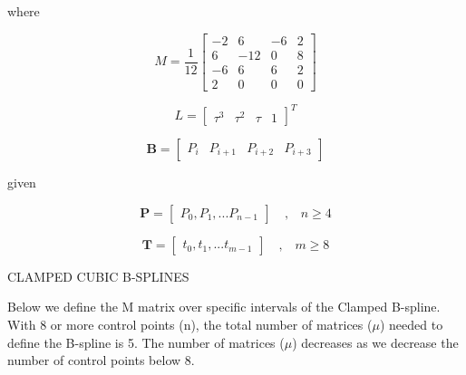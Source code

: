\documentclass{article}
\begin{document}
    where 
    
    \begin{equation}
    M = \frac{1}{12} \begin{bmatrix} -2 & 6 & -6 & 2 \\
                                          6 & -12 & 0 & 8 \\
                                         -6 & 6 & 6 & 2 \\
                                          2 & 0 & 0 & 0 \end{bmatrix}
    \end{equation}
    
    \begin{equation}
        L = \begin{bmatrix} \tau^{3} & \tau^{2} & \tau & 1 \end{bmatrix}^{T}
    \end{equation}
    
    \begin{equation}
        \textbf{B} = \begin{bmatrix} P_{i} & P_{i+1} & P_{i+2} & P_{i+3}\end{bmatrix}
    \end{equation}
    
    given
    
    \begin{equation}
    \textbf{P} = \begin{bmatrix} P_0, P_1, ... P_{n-1} \end{bmatrix} \quad \text{,} \quad n \geq 4
    \end{equation}
    
    \begin{equation}
        \textbf{T} = \begin{bmatrix} t_0, t_1, ... t_{m-1} \end{bmatrix} \quad \text{,} \quad m \geq 8
    \end{equation}
    
    
\noindent CLAMPED CUBIC B-SPLINES
\hfill \break

    Below we define the M matrix over specific intervals of the Clamped B-spline. With 8 or more control points (n), the total number of matrices (\(\mu\)) needed to define the B-spline is 5. The number of matrices (\(\mu\)) decreases as we decrease the number of control points below 8.
\end{document}
